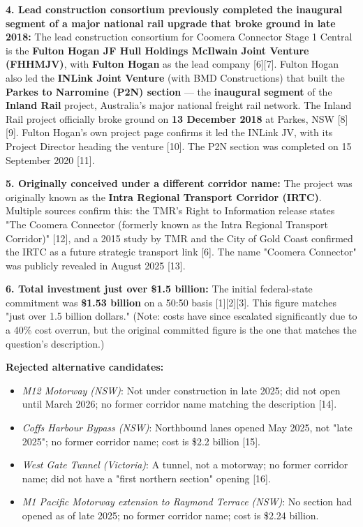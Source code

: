 \documentclass[table]{gtech}
\begin{document}
\begin{tcolorbox}
\textbf{4. Lead construction consortium previously completed the inaugural segment of a major national rail upgrade that broke ground in late 2018:} The lead construction consortium for Coomera Connector Stage 1 Central is the \textbf{Fulton Hogan JF Hull Holdings McIlwain Joint Venture (FHHMJV)}, with \textbf{Fulton Hogan} as the lead company [6][7]. Fulton Hogan also led the \textbf{INLink Joint Venture} (with BMD Constructions) that built the \textbf{Parkes to Narromine (P2N) section} --- the \textbf{inaugural segment} of the \textbf{Inland Rail} project, Australia's major national freight rail network. The Inland Rail project officially broke ground on \textbf{13 December 2018} at Parkes, NSW [8][9]. Fulton Hogan's own project page confirms it led the INLink JV, with its Project Director heading the venture [10]. The P2N section was completed on 15 September 2020 [11].

\textbf{5. Originally conceived under a different corridor name:} The project was originally known as the \textbf{Intra Regional Transport Corridor (IRTC)}. Multiple sources confirm this: the TMR's Right to Information release states "The Coomera Connector (formerly known as the Intra Regional Transport Corridor)" [12], and a 2015 study by TMR and the City of Gold Coast confirmed the IRTC as a future strategic transport link [6]. The name "Coomera Connector" was publicly revealed in August 2025 [13].

\textbf{6. Total investment just over \$1.5 billion:} The initial federal-state commitment was \textbf{\$1.53 billion} on a 50:50 basis [1][2][3]. This figure matches "just over 1.5 billion dollars." (Note: costs have since escalated significantly due to a 40\% cost overrun, but the original committed figure is the one that matches the question's description.)

\textbf{Rejected alternative candidates:}

\begin{itemize}[leftmargin=1.3em,topsep=2pt,itemsep=1pt,parsep=0pt]
\item \emph{M12 Motorway (NSW)}: Not under construction in late 2025; did not open until March 2026; no former corridor name matching the description [14].
\item \emph{Coffs Harbour Bypass (NSW)}: Northbound lanes opened May 2025, not "late 2025"; no former corridor name; cost is \$2.2 billion [15].
\item \emph{West Gate Tunnel (Victoria)}: A tunnel, not a motorway; no former corridor name; did not have a "first northern section" opening [16].
\item \emph{M1 Pacific Motorway extension to Raymond Terrace (NSW)}: No section had opened as of late 2025; no former corridor name; cost is \$2.24 billion.
\end{itemize}


\end{tcolorbox}
\end{document}
